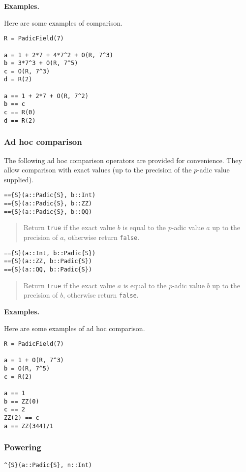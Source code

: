 \documentclass[a4paper,10pt]{article}
\newcommand{\code}{\lstinline}
\newcommand{\desc}[1]{\vspace{-3mm}\begin{quote}#1\end{quote}}
\begin{document}
{{\textbf{Examples.}

Here are some examples of comparison.

\begin{lstlisting}
R = PadicField(7)

a = 1 + 2*7 + 4*7^2 + O(R, 7^3)
b = 3*7^3 + O(R, 7^5)
c = O(R, 7^3)
d = R(2)

a == 1 + 2*7 + O(R, 7^2)
b == c
c == R(0)
d == R(2)
\end{lstlisting}

\subsubsection{Ad hoc comparison}

The following ad hoc comparison operators are provided for convenience. They
allow comparison with exact values (up to the precision of the $p$-adic value
supplied).

\begin{lstlisting}
=={S}(a::Padic{S}, b::Int)
=={S}(a::Padic{S}, b::ZZ)
=={S}(a::Padic{S}, b::QQ)
\end{lstlisting}

\desc{Return \code{true} if the exact value $b$ is equal to the $p$-adic 
value $a$ up to the precision of $a$, otherwise return \code{false}.}

\begin{lstlisting}
=={S}(a::Int, b::Padic{S})
=={S}(a::ZZ, b::Padic{S})
=={S}(a::QQ, b::Padic{S})
\end{lstlisting}

\desc{Return \code{true} if the exact value $a$ is equal to the $p$-adic 
value $b$ up to the precision of $b$, otherwise return \code{false}.}

\textbf{Examples.}

Here are some examples of ad hoc comparison.

\begin{lstlisting}
R = PadicField(7)

a = 1 + O(R, 7^3)
b = O(R, 7^5)
c = R(2)

a == 1
b == ZZ(0)
c == 2
ZZ(2) == c
a == ZZ(344)/1
\end{lstlisting}

\subsubsection{Powering}

\begin{lstlisting}
^{S}(a::Padic{S}, n::Int)
\end{lstlisting}

}}
\end{document}

